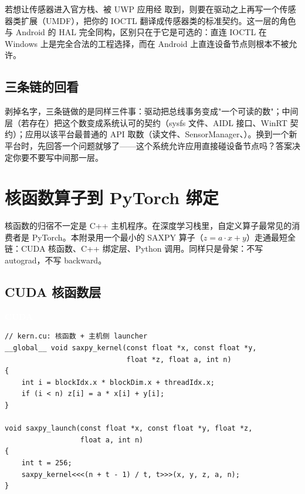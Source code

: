\documentclass[12pt,a4paper,fontset=fandol]{ctexbook}
\newcommand{\cudalabel}{%
  \begin{tcolorbox}[enhanced,colback=cudaheadbg,colframe=cudaheadbg,
    arc=1mm,boxrule=0mm,left=6pt,right=6pt,top=2pt,bottom=2pt,
    halign=left,oversize]
    \textcolor{white}{\small\bfseries CUDA}
  \end{tcolorbox}\vspace{-4pt}}
\begin{document}
若想让传感器进入官方栈、被 UWP 应用经  取到，则要在驱动之上再写一个传感器类扩展（UMDF），把你的 IOCTL 翻译成传感器类的标准契约。这一层的角色与 Android 的 HAL 完全同构，区别只在于它是可选的：直连 IOCTL 在 Windows 上是完全合法的工程选择，而在 Android 上直连设备节点则根本不被允许。

\section{三条链的回看}

\begin{tcolorbox}[compare={三条链，同一副骨架}]
剥掉名字，三条链做的是同样三件事：驱动把总线事务变成"一个可读的数"；中间层（若存在）把这个数变成系统认可的契约（sysfs 文件、AIDL 接口、WinRT 契约）；应用以该平台最普通的 API 取数（读文件、SensorManager、）。换到一个新平台时，先回答一个问题就够了——这个系统允许应用直接碰设备节点吗？答案决定你要不要写中间那一层。
\end{tcolorbox}

\chapter{核函数算子到 PyTorch 绑定}\label{app:torch-bind}

核函数的归宿不一定是 C++ 主机程序。在深度学习栈里，自定义算子最常见的消费者是 PyTorch。本附录用一个最小的 SAXPY 算子（$z = a \cdot x + y$）走通最短全链：CUDA 核函数、C++ 绑定层、Python 调用。同样只是骨架：不写 autograd，不写 backward。

\section{CUDA 核函数层}

\cudalabel
\begin{lstlisting}[style=cudastyle]
// kern.cu: 核函数 + 主机侧 launcher
__global__ void saxpy_kernel(const float *x, const float *y,
                             float *z, float a, int n)
{
    int i = blockIdx.x * blockDim.x + threadIdx.x;
    if (i < n) z[i] = a * x[i] + y[i];
}

void saxpy_launch(const float *x, const float *y, float *z,
                  float a, int n)
{
    int t = 256;
    saxpy_kernel<<<(n + t - 1) / t, t>>>(x, y, z, a, n);
}
\end{lstlisting}
\end{document}
